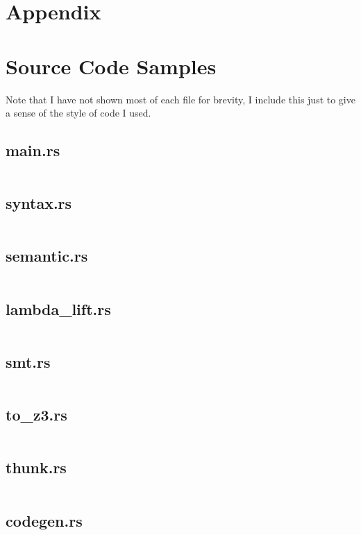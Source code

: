\section{Appendix}
\appendix

\section{Source Code Samples}

Note that I have not shown most of each file for brevity, I include this just to give a sense of
the style of code I used.

\subsection{main.rs}
\inputminted{rust}{./src/main.rs}

\subsection{syntax.rs}
\inputminted{rust}{./src/syntax.rs}

\subsection{semantic.rs}
\inputminted{rust}{./src/semantic.rs}

\subsection{lambda\_lift.rs}
\inputminted{rust}{./src/lambda_lift.rs}

\subsection{smt.rs}
\inputminted{rust}{./src/smt.rs}

\subsection{to\_z3.rs}
\inputminted{rust}{./src/to_z3.rs}

\subsection{thunk.rs}
\inputminted{rust}{./src/thunk.rs}

\subsection{codegen.rs}
\inputminted{rust}{./src/codegen.rs}

